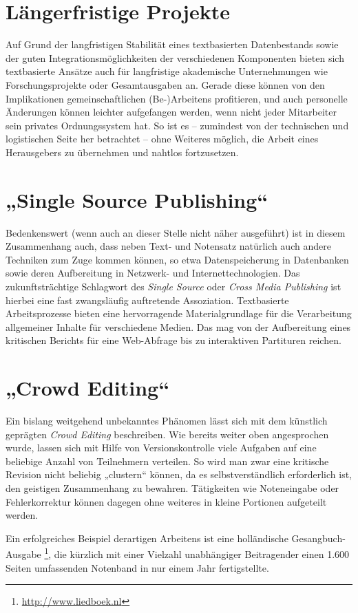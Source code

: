 \documentclass[DIV=12]{scrreprt}
\begin{document}
\section{Längerfristige Projekte}
\label{sec:pt_longrunning-projects}
Auf Grund der langfristigen Stabilität eines textbasierten Datenbestands sowie der guten Integrationsmöglichkeiten der verschiedenen Komponenten bieten sich textbasierte Ansätze auch für langfristige akademische Unternehmungen wie Forschungsprojekte oder Gesamtausgaben an.
Gerade diese können von den Implikationen gemeinschaftlichen (Be-)Arbeitens profitieren, und auch personelle Änderungen können leichter aufgefangen werden, wenn nicht jeder Mitarbeiter sein privates Ordnungssystem hat.
So ist es -- zumindest von der technischen und logistischen Seite her betrachtet -- ohne Weiteres möglich, die Arbeit eines Herausgebers zu übernehmen und nahtlos fortzusetzen.


\section{„Single Source Publishing“}
\label{sec:pt_single-source-publishing}
Bedenkenswert (wenn auch an dieser Stelle nicht näher ausgeführt) ist in diesem Zusammenhang auch, dass neben Text- und Notensatz natürlich auch andere Techniken zum Zuge kommen können, so etwa Datenspeicherung in Datenbanken sowie deren Aufbereitung in Netzwerk- und Internettechnologien.
Das zukunftsträchtige Schlagwort des \emph{Single Source} oder \emph{Cross Media Publishing} ist hierbei eine fast zwangsläufig auftretende Assoziation.
Textbasierte Arbeitsprozesse bieten eine hervorragende Materialgrundlage für die Verarbeitung allgemeiner Inhalte für verschiedene Medien.
Das mag von der Aufbereitung eines kritischen Berichts für eine Web-Abfrage bis zu interaktiven Partituren reichen.

\section{„Crowd Editing“}
\label{sec:pt_crowd-editing}
Ein bislang weitgehend unbekanntes Phänomen lässt sich mit dem künstlich geprägten \emph{Crowd Editing} beschreiben.
Wie bereits weiter oben angesprochen wurde, lassen sich mit Hilfe von Versionskontrolle viele Aufgaben auf eine beliebige Anzahl von Teilnehmern verteilen.
So wird man zwar eine kritische Revision nicht beliebig „clustern“ können, da es selbstverständlich erforderlich ist, den geistigen Zusammenhang zu bewahren.
Tätigkeiten wie Noteneingabe oder Fehlerkorrektur können dagegen ohne weiteres in kleine Portionen aufgeteilt werden.

Ein erfolgreiches Beispiel derartigen Arbeitens ist eine holländische Gesangbuch-Ausgabe%
\footnote{\url{http://www.liedboek.nl}},
die kürzlich mit einer Vielzahl unabhängiger Beitragender einen 1.600 Seiten umfassenden Notenband in nur einem Jahr fertigstellte.
\end{document}
